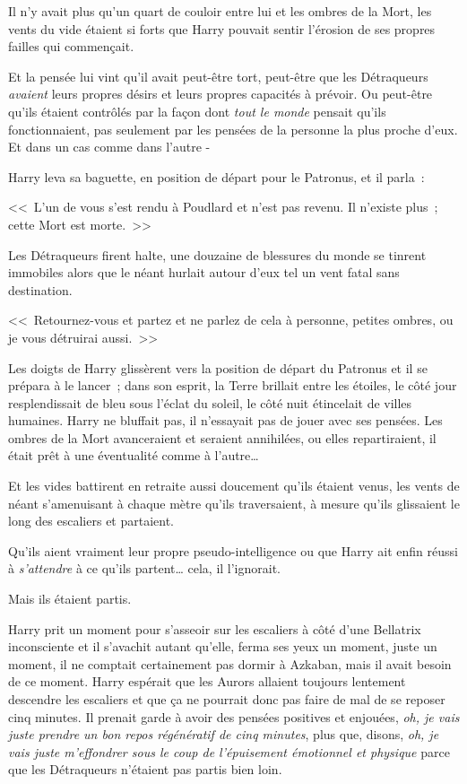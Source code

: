 Il n'y avait plus qu'un quart de couloir entre lui et les ombres de la Mort, les vents du vide étaient si forts que Harry pouvait sentir l'érosion de ses propres failles qui commençait.

Et la pensée lui vint qu'il avait peut-être tort, peut-être que les Détraqueurs \emph{avaient} leurs propres désirs et leurs propres capacités à prévoir. Ou peut-être qu'ils étaient contrôlés par la façon dont \emph{tout le monde} pensait qu'ils fonctionnaient, pas seulement par les pensées de la personne la plus proche d'eux. Et dans un cas comme dans l'autre -

Harry leva sa baguette, en position de départ pour le Patronus, et il parla~:

<<~L'un de vous s'est rendu à Poudlard et n'est pas revenu. Il n'existe plus~; cette Mort est morte.~>>

Les Détraqueurs firent halte, une douzaine de blessures du monde se tinrent immobiles alors que le néant hurlait autour d'eux tel un vent fatal sans destination.

<<~Retournez-vous et partez et ne parlez de cela à personne, petites ombres, ou je vous détruirai aussi.~>>

Les doigts de Harry glissèrent vers la position de départ du Patronus et il se prépara à le lancer~; dans son esprit, la Terre brillait entre les étoiles, le côté jour resplendissait de bleu sous l'éclat du soleil, le côté nuit étincelait de villes humaines. Harry ne bluffait pas, il n'essayait pas de jouer avec ses pensées. Les ombres de la Mort avanceraient et seraient annihilées, ou elles repartiraient, il était prêt à une éventualité comme à l'autre…

Et les vides battirent en retraite aussi doucement qu'ils étaient venus, les vents de néant s'amenuisant à chaque mètre qu'ils traversaient, à mesure qu'ils glissaient le long des escaliers et partaient.

Qu'ils aient vraiment leur propre pseudo-intelligence ou que Harry ait enfin réussi à \emph{s'attendre} à ce qu'ils partent… cela, il l'ignorait.

Mais ils étaient partis.

Harry prit un moment pour s'asseoir sur les escaliers à côté d'une Bellatrix inconsciente et il s'avachit autant qu'elle, ferma ses yeux un moment, juste un moment, il ne comptait certainement pas dormir à Azkaban, mais il avait besoin de ce moment. Harry espérait que les Aurors allaient toujours lentement descendre les escaliers et que ça ne pourrait donc pas faire de mal de se reposer cinq minutes. Il prenait garde à avoir des pensées positives et enjouées, \emph{oh, je vais juste prendre un bon repos régénératif de cinq minutes}, plus que, disons, \emph{oh, je vais juste m'effondrer sous le coup de l'épuisement émotionnel et physique} parce que les Détraqueurs n'étaient pas partis bien loin.

